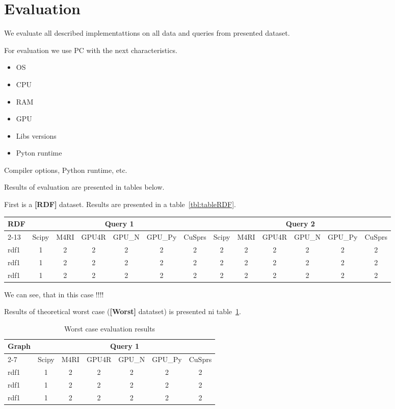 \section{Evaluation}

We evaluate all described implementattions on all data and queries from presented dataset.

For evaluation we use PC with the next characteristics.
\begin{itemize}
  \item OS
  \item CPU
  \item RAM
  \item GPU
  \item Libs versions
  \item Pyton runtime
\end{itemize}

Compiler options, Python runtime, etc.

Results of evaluation are presented in tables below.

First is a \textbf{[RDF]} dataset. 
Results are presented in a table~\ref{tbl:tableRDF}.

\begin{table*}[h!]
\caption{RDFs querying results}
\label{tbl:tableRDF}
\begin{tabular}{| l | c | c | c | c | c | c | c | c | c | c | c | c |}
    \hline
    \multirow{2}{*}{RDF} & \multicolumn{6}{|c|}{Query 1}                               & \multicolumn{6}{|c|}{Query 2} \\ 
    \cline{2-13}
                         & Scipy & M4RI & GPU4R & GPU\_N & GPU\_Py & CuSprs & Scipy & M4RI & GPU4R & GPU\_N & GPU\_Py & CuSprs \\
    \hline
    \hline
    rdf1 & 1 & 2 & 2& 2& 2& 2& 2& 2& 2& 2& 2& 2\\ 
    rdf1 & 1 & 2 & 2& 2& 2& 2& 2& 2& 2& 2& 2& 2\\ 
    rdf1 & 1 & 2 & 2& 2& 2& 2& 2& 2& 2& 2& 2& 2\\ 
    \hline
  \end{tabular}
\end{table*}


We can see, that in this case !!!!


Results of theoretical worst case (\textbf{[Worst]} datatset) is presented ni table~\ref{tbl:tableWorst}.



\begin{table}[h!]
\caption{Worst case evaluation results}
\label{tbl:tableWorst}
\begin{tabular}{| l | c | c | c | c | c | c | }
    \hline
    \multirow{2}{*}{Graph} & \multicolumn{6}{|c|}{Query 1} \\ 
    \cline{2-7}
                         & Scipy & M4RI & GPU4R & GPU\_N & GPU\_Py & CuSprs  \\
    \hline
    \hline
    rdf1 & 1 & 2 & 2& 2& 2& 2 \\ 
    rdf1 & 1 & 2 & 2& 2& 2& 2 \\ 
    rdf1 & 1 & 2 & 2& 2& 2& 2 \\ 
    \hline
  \end{tabular}
\end{table}


